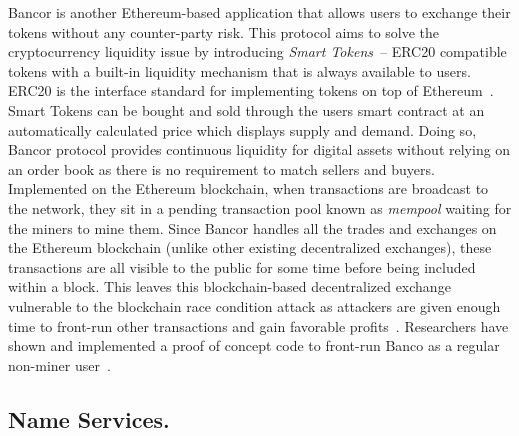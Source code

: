 Bancor is another Ethereum-based application that allows users to exchange their tokens without any counter-party risk. This protocol aims to solve the cryptocurrency liquidity issue by introducing \textit{Smart Tokens}~\cite{hertzog2017bancor}-- ERC20 compatible tokens with a built-in liquidity mechanism that is always available to users. ERC20 is the interface standard for implementing tokens on top of Ethereum~\cite{erc20}. Smart Tokens can be bought and sold through the users smart contract at an automatically calculated price which displays supply and demand. Doing so, Bancor protocol provides continuous liquidity for digital assets without relying on an order book as there is no requirement to match sellers and buyers.
Implemented on the Ethereum blockchain, when transactions are broadcast to the network, they sit in a pending transaction pool known as \textit{mempool} waiting for the miners to mine them. Since Bancor handles all the trades and exchanges on the Ethereum blockchain (unlike other existing decentralized exchanges), these transactions are all visible to the public for some time before being included within a block. This leaves this blockchain-based decentralized exchange vulnerable to the blockchain race condition attack as attackers are given enough time to front-run other transactions and gain favorable profits~\cite{BancorIs7:online}. Researchers have shown and implemented a proof of concept code to front-run Banco as a regular non-miner user~\cite{NewTab13:online}.

\subsection{Name Services.}

